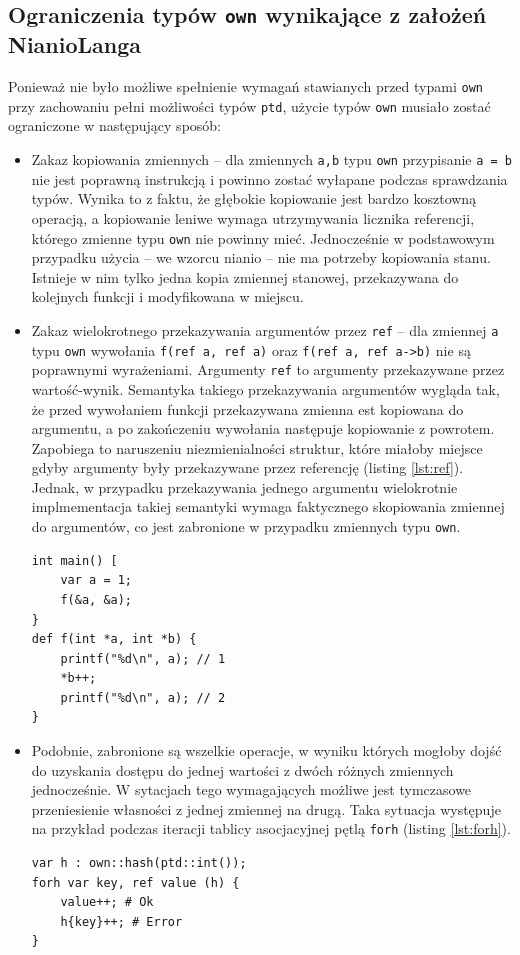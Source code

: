 \documentclass[licencjacka]{pracamgr}
\begin{document}
\subsection{Ograniczenia typów \texttt{own} wynikające z założeń NianioLanga}
Ponieważ nie było możliwe spełnienie wymagań stawianych przed typami \texttt{own} przy zachowaniu pełni
możliwości typów \texttt{ptd}, użycie typów \texttt{own} musiało zostać ograniczone w następujący sposób:
\begin{itemize}
 \item Zakaz kopiowania zmiennych -- dla zmiennych \texttt{a,b} typu \texttt{own} przypisanie
 \texttt{a = b} nie jest poprawną instrukcją i powinno zostać wyłapane podczas sprawdzania typów.
 Wynika to z faktu, że głębokie kopiowanie jest bardzo kosztowną operacją, a kopiowanie leniwe wymaga
 utrzymywania licznika referencji, którego zmienne typu \texttt{own} nie powinny mieć.
 Jednocześnie w podstawowym przypadku użycia -- we wzorcu nianio -- nie ma potrzeby kopiowania stanu.
 Istnieje w nim tylko jedna kopia zmiennej stanowej, przekazywana do kolejnych funkcji i modyfikowana w miejscu.
 \item Zakaz wielokrotnego przekazywania argumentów przez \texttt{ref} -- dla zmiennej \texttt{a} typu
 \texttt{own} wywołania \texttt{f(ref a, ref a)} oraz \texttt{f(ref a, ref a->b)} nie są poprawnymi wyrażeniami.
 Argumenty \texttt{ref} to argumenty przekazywane przez wartość-wynik.
 Semantyka takiego przekazywania argumentów wygląda tak, że przed wywołaniem funkcji przekazywana zmienna
 est kopiowana do argumentu, a po zakończeniu wywołania następuje kopiowanie z powrotem.
 Zapobiega to naruszeniu niezmienialności struktur,
 które miałoby miejsce gdyby argumenty były przekazywane przez referencję (listing \ref{lst:ref}).
 Jednak, w przypadku przekazywania jednego argumentu wielokrotnie implmementacja takiej semantyki wymaga
 faktycznego skopiowania zmiennej do argumentów, co jest zabronione w przypadku zmiennych typu \texttt{own}.
\begin{lstlisting}[caption={Naruszenie niezmienialności wartości w C},label={lst:ref}]
int main() [
	var a = 1;
	f(&a, &a);
}
def f(int *a, int *b) {
	printf("%d\n", a); // 1
	*b++;
	printf("%d\n", a); // 2
}
\end{lstlisting}
 \item Podobnie, zabronione są wszelkie operacje, w wyniku których mogłoby dojść do uzyskania dostępu
 do jednej wartości z dwóch różnych zmiennych jednocześnie. W sytacjach tego wymagających możliwe jest tymczasowe
 przeniesienie własności z jednej zmiennej na drugą. Taka sytuacja występuje na przykład podczas iteracji
 tablicy asocjacyjnej pętlą \texttt{forh} (listing \ref{lst:forh}).
\begin{lstlisting}[caption={Odwołanie do zmiennej, która utraciła własność},label={lst:forh}]
var h : own::hash(ptd::int());
forh var key, ref value (h) {
	value++; # Ok
	h{key}++; # Error
}
\end{lstlisting}
\end{itemize}
\end{document}
